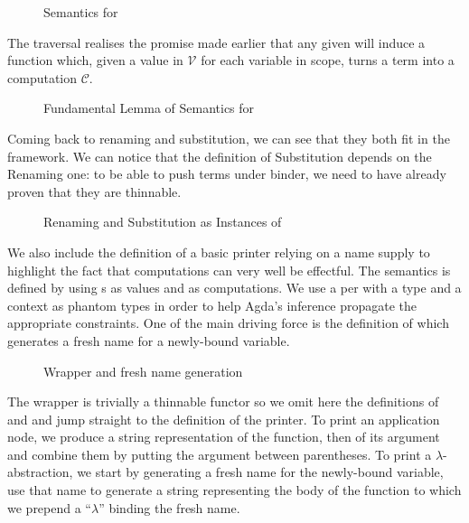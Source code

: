 \begin{figure}[h]
\caption{Semantics for }
\end{figure}

The traversal  realises the promise made earlier that any given
{  } will induce a function which,
given a value in $\mathcal{V}$ for each variable in scope, turns a term
into a computation $\mathcal{C}$.

\begin{figure}[h]
\caption{Fundamental Lemma of Semantics for }
\end{figure}

Coming back to renaming and substitution, we can see that they both fit
in the  framework. We can notice that the definition of Substitution
depends on the Renaming one: to be able to push terms under binder, we
need to have already proven that they are thinnable.

\begin{figure}[h]
\begin{minipage}{0.45\textwidth}
\end{minipage}
\begin{minipage}{0.45\textwidth}
\end{minipage}
\caption{Renaming and Substitution as Instances of }
\end{figure}

We also include the definition of a basic printer relying on a
name supply to highlight the fact that computations can very well be
effectful. The  semantics is defined by using s
as values and {  } as computations. We use a
per with a type and a context as phantom types in order to
help Agda's inference propagate the appropriate constraints.
One of the main driving force is the definition of  which
generates a fresh name for a newly-bound variable.

\begin{figure}[h]
\caption{Wrapper and fresh name generation}
\end{figure}

The wrapper  is trivially a thinnable functor so we omit here
the definitions of  and  and jump straight
to the definition of the printer. To print an application node, we produce
a string representation of the function, then of its argument and combine
them by putting the argument between parentheses. To print a $\lambda$-abstraction,
we start by generating a fresh name for the newly-bound variable, use that
name to generate a string representing the body of the function to which we
prepend a ``$\lambda$'' binding the fresh name.

